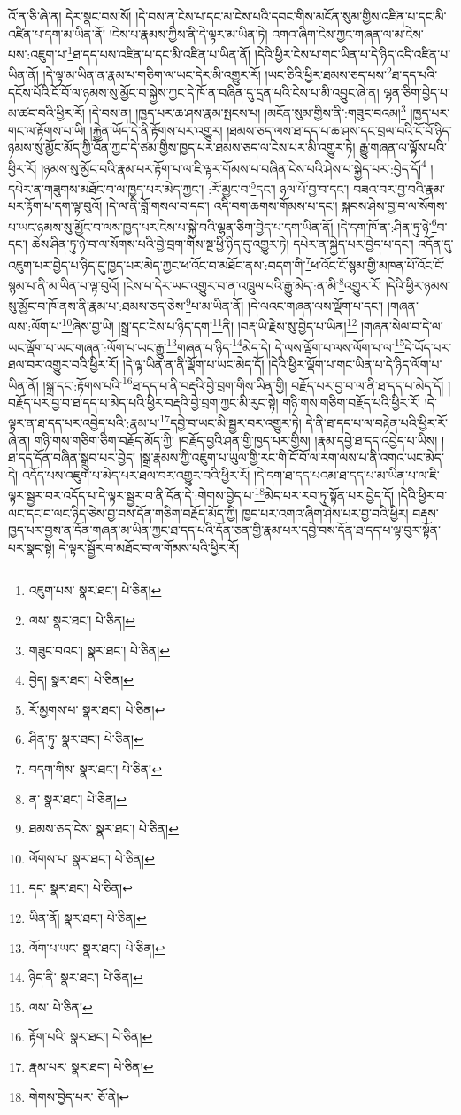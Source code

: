 འོ་ན་ཅི་ཞེ་ན། དེར་སྣང་བས་སོ། །དེ་བས་ན་ངེས་པ་དང་མ་ངེས་པའི་དབང་གིས་མངོན་སུམ་གྱིས་འཛིན་པ་དང་མི་འཛིན་པ་དག་མ་ཡིན་ནོ། །ངེས་པ་རྣམས་ཀྱིས་ནི་དེ་ལྟར་མ་ཡིན་ཏེ། འགའ་ཞིག་ངེས་ཀྱང་གཞན་ལ་མ་ངེས་པས་:འཇུག་པ་\footnote{འཇུག་པས་  སྣར་ཐང་།  པེ་ཅིན། }ཐ་དད་པས་འཛིན་པ་དང་མི་འཛིན་པ་ཡིན་ནོ། །དེའི་ཕྱིར་ངེས་པ་གང་ཡིན་པ་དེ་ཉིད་འདི་འཛིན་པ་ཡིན་ནོ། །དེ་ལྟ་མ་ཡིན་ན་རྣམ་པ་གཅིག་ལ་ཡང་དེར་མི་འགྱུར་རོ། །ཡང་ཅིའི་ཕྱིར་ཐམས་ཅད་པས་\footnote{ལས་  སྣར་ཐང་།  པེ་ཅིན། }ཐ་དད་པའི་དངོས་པོའི་ངོ་བོ་ལ་ཉམས་སུ་མྱོང་བ་སྐྱེས་ཀྱང་དེ་ཁོ་ན་བཞིན་དུ་དྲན་པའི་ངེས་པ་མི་འབྱུང་ཞེ་ན། ལྷན་ཅིག་བྱེད་པ་མ་ཚང་བའི་ཕྱིར་རོ། །དེ་བས་ན། །ཁྱད་པར་ཆ་ཤས་རྣམ་སྤངས་པ། །མངོན་སུམ་གྱིས་ནི་:གཟུང་བའམ།\footnote{གཟུང་བའང་།  སྣར་ཐང་།  པེ་ཅིན། } །ཁྱད་པར་གང་ལ་རྟོགས་པ་ཡི། །རྐྱེན་ཡོད་དེ་ནི་རྟོགས་པར་འགྱུར། །ཐམས་ཅད་ལས་ཐ་དད་པ་ཆ་ཤས་དང་བྲལ་བའི་ངོ་བོ་ཉིད་ཉམས་སུ་མྱོང་མོད་ཀྱི་འོན་ཀྱང་དེ་ཙམ་གྱིས་ཁྱད་པར་ཐམས་ཅད་ལ་ངེས་པར་མི་འགྱུར་ཏེ། རྒྱུ་གཞན་ལ་ལྟོས་པའི་ཕྱིར་རོ། །ཉམས་སུ་མྱོང་བའི་རྣམ་པར་རྟོག་པ་ལ་ཇི་ལྟར་གོམས་པ་བཞིན་ངེས་པའི་ཤེས་པ་སྐྱེད་པར་:བྱེད་དོ།\footnote{བྱེད།  སྣར་ཐང་།  པེ་ཅིན། } །དཔེར་ན་གཟུགས་མཐོང་བ་ལ་ཁྱད་པར་མེད་ཀྱང་། :རོ་མྱང་བ་\footnote{རོ་མྱགས་པ་  སྣར་ཐང་།  པེ་ཅིན། }དང་། ཉལ་པོ་བྱ་བ་དང་། བཟའ་བར་བྱ་བའི་རྣམ་པར་རྟོག་པ་དག་ལྟ་བུའོ། །དེ་ལ་ནི་བློ་གསལ་བ་དང་། འདི་བག་ཆགས་གོམས་པ་དང་། སྐབས་ཤེས་བྱ་བ་ལ་སོགས་པ་ཡང་ཉམས་སུ་མྱོང་བ་ལས་ཁྱད་པར་ངེས་པ་སྐྱེ་བའི་ལྷན་ཅིག་བྱེད་པ་དག་ཡིན་ནོ། །དེ་དག་ཁོ་ན་:ཤིན་ཏུ་ཉེ་\footnote{ཤིན་ཏུ་  སྣར་ཐང་།  པེ་ཅིན། }བ་དང་། ཆེས་ཤིན་ཏུ་ཉེ་བ་ལ་སོགས་པའི་བྱེ་བྲག་གིས་སྔ་ཕྱི་ཉིད་དུ་འགྱུར་ཏེ། དཔེར་ན་སྐྱེད་པར་བྱེད་པ་དང་། འདོན་དུ་འཇུག་པར་བྱེད་པ་ཉིད་དུ་ཁྱད་པར་མེད་ཀྱང་ཕ་འོང་བ་མཐོང་ནས་:བདག་གི་\footnote{བདག་གིས་  སྣར་ཐང་།  པེ་ཅིན། }ཕ་འོང་ངོ་སྙམ་གྱི་མཁན་པོ་འོང་ངོ་སྙམ་པ་ནི་མ་ཡིན་པ་ལྟ་བུའོ། །ངེས་པ་དེར་ཡང་འགྱུར་བ་ན་འཁྲུལ་པའི་རྒྱུ་མེད་:ན་མི་\footnote{ན་  སྣར་ཐང་།  པེ་ཅིན། }འགྱུར་རོ། །དེའི་ཕྱིར་ཉམས་སུ་མྱོང་བ་ཁོ་ནས་ནི་རྣམ་པ་:ཐམས་ཅད་ཅེས་\footnote{ཐམས་ཅད་ངེས་  སྣར་ཐང་།  པེ་ཅིན། }པ་མ་ཡིན་ནོ། །དེ་ལའང་གཞན་ལས་ལྡོག་པ་དང་། །གཞན་ལས་:ལོག་པ་\footnote{ལོགས་པ་  སྣར་ཐང་།  པེ་ཅིན། }ཞེས་བྱ་ཡི། །སྒྲ་དང་ངེས་པ་ཉིད་དག་\footnote{དང་  སྣར་ཐང་།  པེ་ཅིན། }ནི། །བརྡ་ཡི་རྗེས་སུ་བྱེད་པ་ཡིན།\footnote{ཡིན་ནོ།  སྣར་ཐང་།  པེ་ཅིན། } །གཞན་སེལ་བ་དེ་ལ་ཡང་ལྡོག་པ་ཡང་གཞན་:ལོག་པ་ཡང་རྒྱུ་\footnote{ལོག་པ་ཡང་  སྣར་ཐང་།  པེ་ཅིན། }གཞན་པ་ཉིད་\footnote{ཉིད་ནི་  སྣར་ཐང་།  པེ་ཅིན། }མེད་དེ། དེ་ལས་ལྡོག་པ་ལས་ལོག་པ་ལ་\footnote{ལས་  པེ་ཅིན། }དེ་ཡོད་པར་ཐལ་བར་འགྱུར་བའི་ཕྱིར་རོ། །དེ་ལྟ་ཡིན་ན་ནི་ལྡོག་པ་ཡང་མེད་དོ། །དེའི་ཕྱིར་ལྡོག་པ་གང་ཡིན་པ་དེ་ཉིད་ལོག་པ་ཡིན་ནོ། །སྒྲ་དང་:རྟོགས་པའི་\footnote{རྟོག་པའི་  སྣར་ཐང་།  པེ་ཅིན། }ཐ་དད་པ་ནི་བརྡའི་བྱེ་བྲག་གིས་ཡིན་གྱི། བརྗོད་པར་བྱ་བ་ལ་ནི་ཐ་དད་པ་མེད་དོ། །བརྗོད་པར་བྱ་བ་ཐ་དད་པ་མེད་པའི་ཕྱིར་བརྡའི་བྱེ་བྲག་ཀྱང་མི་རུང་སྟེ། གཉི་གས་གཅིག་བརྗོད་པའི་ཕྱིར་རོ། །དེ་ལྟར་ན་ཐ་དད་པར་འབྱེད་པའི་:རྣམ་པ་\footnote{རྣམ་པར་  སྣར་ཐང་།  པེ་ཅིན། }དབྱེ་བ་ཡང་མི་སྦྱར་བར་འགྱུར་ཏེ། དེ་ནི་ཐ་དད་པ་ལ་བརྟེན་པའི་ཕྱིར་རོ་ཞེ་ན། གཉི་གས་གཅིག་ཅིག་བརྗོད་མོད་ཀྱི། །བརྗོད་བྱའི་ཤན་གྱི་ཁྱད་པར་གྱིས། །རྣམ་དབྱེ་ཐ་དད་འབྱེད་པ་ཡིས། །ཐ་དད་དོན་བཞིན་སྒྲུབ་པར་བྱེད། །སྒྲ་རྣམས་ཀྱི་འཇུག་པ་ཡུལ་གྱི་རང་གི་ངོ་བོ་ལ་རག་ལས་པ་ནི་འགའ་ཡང་མེད་དེ། འདོད་པས་འཇུག་པ་མེད་པར་ཐལ་བར་འགྱུར་བའི་ཕྱིར་རོ། །དེ་དག་ཐ་དད་པའམ་ཐ་དད་པ་མ་ཡིན་པ་ལ་ཇི་ལྟར་སྦྱར་བར་འདོད་པ་དེ་ལྟར་སྦྱར་བ་ནི་དོན་དེ་:གེགས་བྱེད་པ་\footnote{གེགས་བྱེད་པར་  ཅོ་ནེ། }མེད་པར་རབ་ཏུ་སྟོན་པར་བྱེད་དོ། །དེའི་ཕྱིར་བ་ལང་དང་བ་ལང་ཉིད་ཅེས་བྱ་བས་དོན་གཅིག་བརྗོད་མོད་ཀྱི། ཁྱད་པར་འགའ་ཞིག་ཤེས་པར་བྱ་བའི་ཕྱིར། བརྡས་ཁྱད་པར་བྱས་ན་དོན་གཞན་མ་ཡིན་ཀྱང་ཐ་དད་པའི་དོན་ཅན་གྱི་རྣམ་པར་དབྱེ་བས་དོན་ཐ་དད་པ་ལྟ་བུར་སྟོན་པར་སྣང་སྟེ། དེ་ལྟར་སྦྱོར་བ་མཐོང་བ་ལ་གོམས་པའི་ཕྱིར་རོ། 